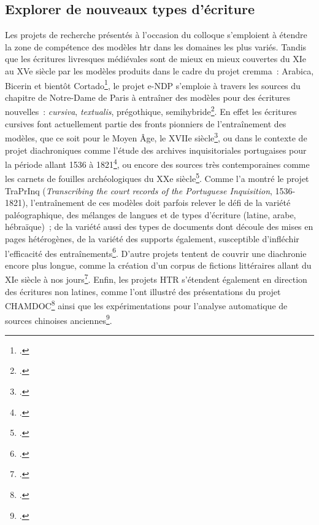 \documentclass[a4paper,12pt,twoside]{book}
\begin{document}
			\subsection{Explorer de nouveaux types d'écriture}
			
				Les projets de recherche présentés à l'occasion du colloque s'emploient
				à étendre la zone de compétence des modèles \gls{htr} dans les domaines les
				plus variés. Tandis que les écritures livresques médiévales sont de
				mieux en mieux couvertes du XIe au XVe siècle par les modèles produits
				dans le cadre du projet \gls{cremma}~: Arabica, Bicerin et bientôt Cortado\footcite{campsCremmaLabProjectsTranscription2022}, le projet e-NDP
				s'emploie à travers les sources du chapitre de Notre-Dame de Paris à
				entraîner des modèles pour des écritures nouvelles~: \textit{cursiva},
				\textit{textualis}, prégothique, semihybride\footcite{torresaguilarModelisationAffinageHTR2022}. En effet les écritures
				cursives font actuellement partie des fronts pionniers de l'entraînement
				des modèles, que ce soit pour le Moyen Âge, le XVIIe siècle\footcite{paupeCursiveXVIIeSiecle2022}, ou dans le contexte de projet
				diachroniques comme l'étude des archives inquisitoriales portugaises
				pour la période allant 1536 à 1821\footcite{baudryArchivesInquisitorialesPortugal2022}, ou encore des sources
				très contemporaines comme les carnets de fouilles archéologiques du XXe
				siècle\footcite{tufferyRetourExperiencesUtilisation2022}. Comme l'a montré
				le projet TraPrInq (\textit{Transcribing the court records of the
					Portuguese Inquisition}, 1536-1821), l'entraînement de ces modèles doit
				parfois relever le défi de la variété paléographique, des mélanges de
				langues et de types d'écriture (latine, arabe, hébraïque)~; de la
				variété aussi des types de documents dont découle des mises en pages
				hétérogènes, de la variété des supports également, susceptible
				d'infléchir l'efficacité des entraînements\footcite{baudryArchivesInquisitorialesPortugal2022}. D'autre projets
				tentent de couvrir une diachronie encore plus longue, comme la création
				d'un corpus de fictions littéraires allant du XIe siècle à nos jours\footcite{campsCremmaLabProjectsTranscription2022}. Enfin, les projets HTR
				s'étendent également en direction des écritures non latines, comme l'ont
				illustré des présentations du projet CHAMDOC\footcite{schweyerAnalyseReconnaissanceIndexation2022} ainsi que les
				expérimentations pour l'analyse automatique de sources chinoises
				anciennes\footcite{bizais-lilligExperimentationsPourAnalyse2022}.
			
\end{document}
